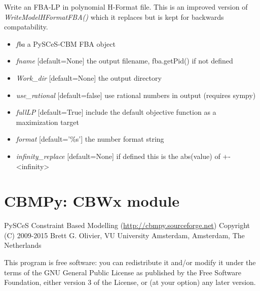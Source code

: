 \documentclass[a4paper,11pt,english]{sphinxmanual}
\begin{document}
\begin{fulllineitems}
\label{modules_doc:cbmpy.CBWrite.writeStoichiometricMatrix}
Write an FBA-LP in polynomial H-Format file. This is an improved version of \emph{WriteModelHFormatFBA()}
which it replaces but is kept for backwards compatability.
\begin{itemize}
\item {} 
\emph{fba} a PySCeS-CBM FBA object

\item {} 
\emph{fname} {[}default=None{]} the output filename, fba.getPid() if not defined

\item {} 
\emph{Work\_dir} {[}default=None{]} the output directory

\item {} 
\emph{use\_rational} {[}default=false{]} use rational numbers in output (requires sympy)

\item {} 
\emph{fullLP} {[}default=True{]} include the default objective function as a maximization target

\item {} 
\emph{format} {[}default='\%s'{]} the number format string

\item {} 
\emph{infinity\_replace} {[}default=None{]} if defined this is the abs(value) of +-\textless{}infinity\textgreater{}

\end{itemize}

\end{fulllineitems}

\label{modules_doc:module-cbmpy.CBWx}

\section{CBMPy: CBWx module}
\label{modules_doc:cbmpy-cbwx-module}
PySCeS Constraint Based Modelling (\href{http://cbmpy.sourceforge.net}{http://cbmpy.sourceforge.net})
Copyright (C) 2009-2015 Brett G. Olivier, VU University Amsterdam, Amsterdam, The Netherlands

This program is free software: you can redistribute it and/or modify
it under the terms of the GNU General Public License as published by
the Free Software Foundation, either version 3 of the License, or
(at your option) any later version.
\end{document}
